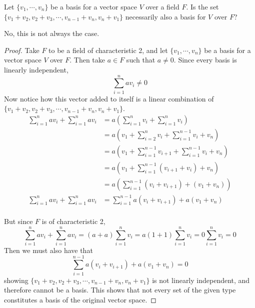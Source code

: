 \documentclass{article}
\begin{document}
\setcounter{problem}{184}
\begin{problem}
Let $\{ v_{1}, \cdots, v_{n} \}$ be a basis for a vector space $V$ over a field $F$. Is the set $\{ v_{1}+v_{2}, v_{2}+v_{3}, \cdots, v_{n-1}+v_{n}, v_{n}+v_{1} \}$ necessarily also a basis for $V$ over $F$?
\end{problem}

\begin{solution}
No, this is not always the case.

\begin{proof}
Take $F$ to be a field of characteristic 2, and let $\{ v_{1}, \cdots, v_{n} \}$ be a basis for a vector space $V$ over $F$. Then take $a \in F$ such that $a\ne 0$. Since every basis is linearly independent,
\[ \sum_{i=1}^{n} av_{i} \ne 0 \]
Now notice how this vector added to itself is a linear combination of $\{ v_{1}+v_{2}, v_{2}+v_{3}, \cdots, v_{n-1}+v_{n}, v_{n}+v_{1} \}$.
\begin{align*}
\sum_{i=1}^{n} av_{i} + \sum_{i=1}^{n} av_{i} &= a\left( \sum_{i=1}^{n} v_{i} +\sum_{i=1}^{n} v_{i} \right)\\
&=  a\left( v_{1} +\sum_{i=2}^{n} v_{i} +\sum_{i=1}^{n-1} v_{i} +v_{n} \right)\\
&= a\left( v_{1} +\sum_{i=1}^{n-1} v_{i+1} +\sum_{i=1}^{n-1} v_{i} +v_{n} \right)\\
&= a\left( v_{1} +\sum_{i=1}^{n-1} ( v_{i+1} +v_{i} ) +v_{n} \right)\\
&= a\left( \sum_{i=1}^{n-1} ( v_{i} +v_{i+1} ) +(v_{1}+v_{n}) \right)\\
\sum_{i=1}^{n} av_{i} + \sum_{i=1}^{n} av_{i} &= \sum_{i=1}^{n-1} a( v_{i} +v_{i+1} ) +a(v_{1}+v_{n})
\end{align*}

\paragraph{}
But since $F$ is of characteristic 2, 
\[ \sum_{i=1}^{n} av_{i} + \sum_{i=1}^{n} av_{i} = (a+a)\sum_{i=1}^{n} v_{i} = a(1+1)\sum_{i=1}^{n} v_{i} = 0 \sum_{i=1}^{n} v_{i} = 0\]
Then we must also have that
\[  \sum_{i=1}^{n-1} a( v_{i} +v_{i+1} ) +a(v_{1}+v_{n}) = 0 \]
showing $\{ v_{1}+v_{2}, v_{2}+v_{3}, \cdots, v_{n-1}+v_{n}, v_{n}+v_{1} \}$ is not linearly independent, and therefore cannot be a basis. This shows that not every set of the given type constitutes a basis of the original vector space.
\end{proof}
\end{solution}
\end{document}
